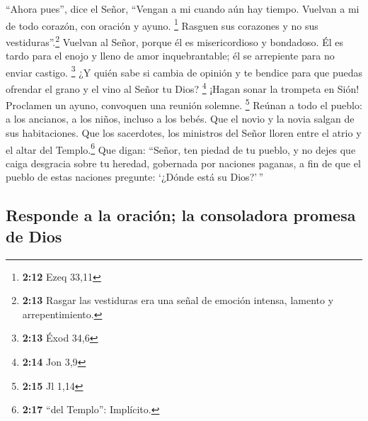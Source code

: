  ``Ahora pues'', dice el Señor, ``Vengan a mi cuando aún
hay tiempo. Vuelvan a mi de todo corazón, con oración y ayuno.
\footnote{\textbf{2:12} Ezeq 33,11}  Rasguen sus
corazones y no sus vestiduras''.\footnote{\textbf{2:13} Rasgar las
  vestiduras era una señal de emoción intensa, lamento y
  arrepentimiento.} Vuelvan al Señor, porque él es misericordioso y
bondadoso. Él es tardo para el enojo y lleno de amor inquebrantable; él
se arrepiente para no enviar castigo. \footnote{\textbf{2:13} Éxod 34,6}
 ¿Y quién sabe si cambia de opinión y te bendice para que
puedas ofrendar el grano y el vino al Señor tu Dios? \footnote{\textbf{2:14}
  Jon 3,9}  ¡Hagan sonar la trompeta en Sión! Proclamen
un ayuno, convoquen una reunión solemne. \footnote{\textbf{2:15} Jl 1,14}
 Reúnan a todo el pueblo: a los ancianos, a los niños,
incluso a los bebés. Que el novio y la novia salgan de sus habitaciones.
 Que los sacerdotes, los ministros del Señor lloren entre
el atrio y el altar del Templo.\footnote{\textbf{2:17} ``del Templo'':
  Implícito.} Que digan: ``Señor, ten piedad de tu pueblo, y no dejes
que caiga desgracia sobre tu heredad, gobernada por naciones paganas, a
fin de que el pueblo de estas naciones pregunte: `¿Dónde está su
Dios?'\,''

\hypertarget{responde-a-la-oraciuxf3n-la-consoladora-promesa-de-dios}{%
\subsection{Responde a la oración; la consoladora promesa de
Dios}\label{responde-a-la-oraciuxf3n-la-consoladora-promesa-de-dios}}

